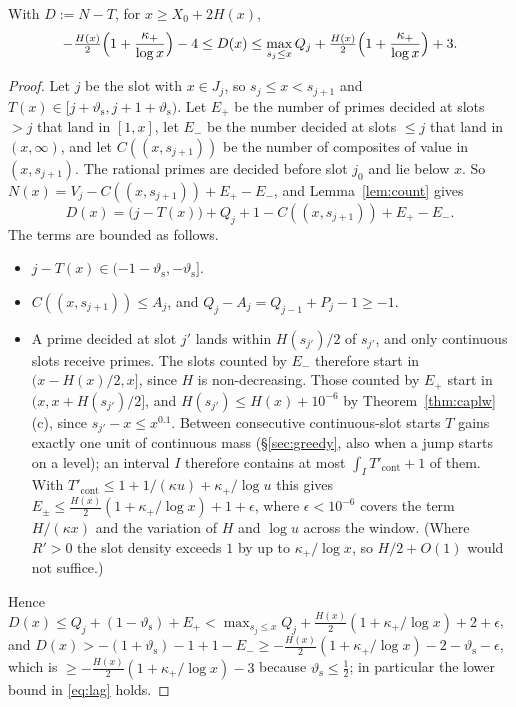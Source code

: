 \begin{corollary}\label{cor:lag}
With $D:=N-T$, for $x\ge X_0+2H(x)$,
\begin{equation}\label{eq:lag}
  -\tfrac{H(x)}2\Bigl(1+\frac{\kappa_+}{\log x}\Bigr)-4\le D(x)\le\max_{s_j\le x}Q_j+\tfrac{H(x)}2\Bigl(1+\frac{\kappa_+}{\log x}\Bigr)+3.
\end{equation}
\end{corollary}
\begin{proof}
Let $j$ be the slot with $x\in J_j$, so $s_j\le x<s_{j+1}$ and $T(x)\in[j+\vartheta_{\mathrm s},j+1+\vartheta_{\mathrm s})$. Let $E_+$ be the number of
primes decided at slots $>j$ that land in $[1,x]$, let $E_-$ be the number decided at slots $\le j$ that land in $(x,\infty)$, and
let $C((x,s_{j+1}))$ be the number of composites of value in $(x,s_{j+1})$. The rational primes are decided before slot $j_0$ and
lie below $x$. So $N(x)=V_j-C((x,s_{j+1}))+E_+-E_-$, and Lemma~\ref{lem:count} gives
\[
  D(x)=\bigl(j-T(x)\bigr)+Q_j+1-C((x,s_{j+1}))+E_+-E_- .
\]
The terms are bounded as follows.
\begin{itemize}
\item $j-T(x)\in(-1-\vartheta_{\mathrm s},-\vartheta_{\mathrm s}]$.
\item $C((x,s_{j+1}))\le A_j$, and $Q_j-A_j=Q_{j-1}+P_j-1\ge-1$.
\item A prime decided at slot $j'$ lands within $H(s_{j'})/2$ of $s_{j'}$, and only continuous slots receive primes. The slots
counted by $E_-$ therefore start in $(x-H(x)/2,x]$, since $H$ is non-decreasing. Those counted by $E_+$ start in
$(x,x+H(s_{j'})/2]$, and $H(s_{j'})\le H(x)+10^{-6}$ by Theorem~\ref{thm:caplw}(c), since $s_{j'}-x\le x^{0.1}$. Between
consecutive continuous-slot starts $T$ gains exactly one unit of continuous mass (\S\ref{sec:greedy}, also when a jump starts on a
level); an interval $I$ therefore contains at most $\int_IT'_{\mathrm{cont}}+1$ of them. With
$T'_{\mathrm{cont}}\le1+1/(\kappa u)+\kappa_+/\log u$ this gives
$E_\pm\le\frac{H(x)}2(1+\kappa_+/\log x)+1+\epsilon$, where $\epsilon<10^{-6}$ covers the term $H/(\kappa x)$ and the variation
of $H$ and $\log u$ across the window. (Where $R'>0$ the slot density exceeds $1$ by up to $\kappa_+/\log x$, so $H/2+O(1)$ would
not suffice.)
\end{itemize}
Hence $D(x)\le Q_j+(1-\vartheta_{\mathrm s})+E_+<\max_{s_j\le x}Q_j+\frac{H(x)}2(1+\kappa_+/\log x)+2+\epsilon$, and
$D(x)>-(1+\vartheta_{\mathrm s})-1+1-E_-\ge-\frac{H(x)}2(1+\kappa_+/\log x)-2-\vartheta_{\mathrm s}-\epsilon$, which is
$\ge-\frac{H(x)}2(1+\kappa_+/\log x)-3$ because $\vartheta_{\mathrm s}\le\frac12$; in particular the lower bound in \eqref{eq:lag} holds.
\end{proof}

